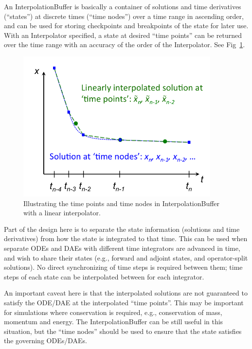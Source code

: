 An InterpolationBuffer is basically a container of solutions and time
derivatives (``states'') at discrete times (``time nodes'') over
a time range in ascending order, and can be used for storing checkpoints
and breakpoints of the state for later use. With an Interpolator specified,
a state at desired ``time points'' can be returned over the time
range with an accuracy of the order of the Interpolator. See Fig~\ref{rythmos:fig:InterpolationBuffer}.
\begin{figure}


\begin{centering}
\includegraphics[width=4in]{figures/InterpolationBuffer}\caption{Illustrating the time points and time nodes in InterpolationBuffer
with a linear interpolator.\label{rythmos:fig:InterpolationBuffer}}

\par\end{centering}

\end{figure}


Part of the design here is to separate the state information (solutions
and time derivatives) from how the state is integrated to that time.
This can be used when separate ODEs and DAEs with different time integrators
are advanced in time, and wish to share their states (e.g., forward
and adjoint states, and operator-split solutions). No direct synchronizing
of time steps is required between them; time steps of each state can
be interpolated between for each integrator. 

An important caveat here is that the interpolated solutions are not
guaranteed to satisfy the ODE/DAE at the interpolated ``time points''.
This may be important for simulations where conservation is required,
e.g., conservation of mass, momentum and energy. The InterpolationBuffer
can be still useful in this situation, but the ``time nodes'' should
be used to ensure that the state satisfies the governing ODEs/DAEs.


